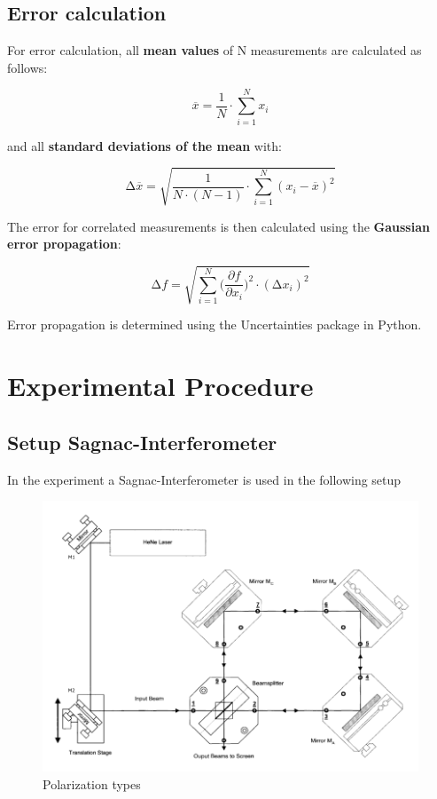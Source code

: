 \subsection{Error calculation}
For error calculation, all \textbf{mean values} of N measurements are
calculated as follows:

\begin{equation}
	\overline{x} = \frac{1}{N} \cdot \sum_{i=1}^N x_i
	\label{eqn:Mittelwert}
\end{equation}

and all \textbf{standard deviations of the mean} with:

\begin{equation}
	\increment\overline{x} = \sqrt{\frac{1}{N\cdot(N-1)}\cdot\sum_{i=1}^N (x_i-\overline{x})^2}
	\label{eqn:St_Mittelwert}
\end{equation}

The error for correlated measurements is then calculated using the
\textbf{Gaussian error propagation}:

\begin{equation}
	\increment{f} = \sqrt{ \sum_{i = 1}^{N}  \biggl(\frac{\partial{f}}{\partial{x_i}}\biggr)^2\cdot(\increment{x_i})^2}
	\label{eqn:Gauss}
\end{equation}

Error propagation is determined using the Uncertainties \cite{uncertainties}
package in Python.


\section{Experimental Procedure}
\subsection{Setup Sagnac-Interferometer}
In the experiment a Sagnac-Interferometer is used in the following setup

\begin{figure}[H]
	\centering
	\includegraphics[width=\textwidth]{Bilder/Aufbau.png}
	\caption{Polarization types \cite{man:v64}}\label{fig:Aufbau}
\end{figure}

